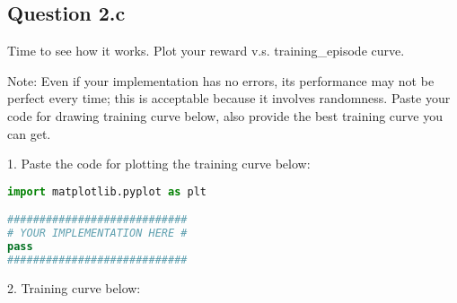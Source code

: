 \documentclass[12pt]{article}
\begin{document}
\subsection*{Question 2.c} 
Time to see how it works. Plot your reward v.s. training\_episode curve.

Note: Even if your implementation has no errors, its performance may not be perfect every time; this is acceptable because it involves randomness. Paste your code for drawing training curve below, also provide the best training curve you can get.

\begin{solution}
1. Paste the code for plotting the training curve below:
\begin{lstlisting}[language=Python]
import matplotlib.pyplot as plt

############################
# YOUR IMPLEMENTATION HERE #
pass
############################
\end{lstlisting}

2. Training curve below:
\end{solution}
\end{document}
